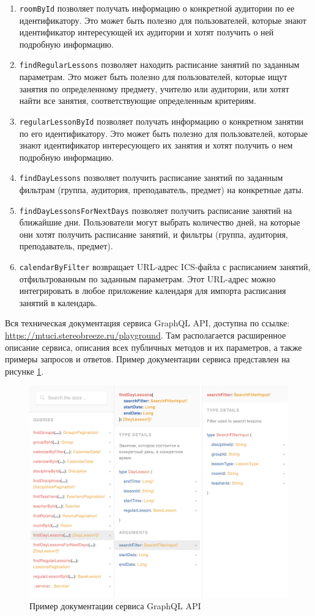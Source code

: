 \begin{enumerate}
\item \texttt{roomById} позволяет получать информацию о конкретной аудитории по ее идентификатору. 
Это может быть полезно для пользователей, которые знают идентификатор интересующей их аудитории и хотят получить о ней подробную информацию.
\item \texttt{findRegularLessons} позволяет находить расписание занятий по заданным параметрам.
Это может быть полезно для пользователей, которые ищут занятия по определенному предмету, учителю или аудитории, или хотят найти все занятия, соответствующие определенным критериям.
\item \texttt{regularLessonById} позволяет получать информацию о конкретном занятии по его идентификатору. 
Это может быть полезно для пользователей, которые знают идентификатор интересующего их занятия и хотят получить о нем подробную информацию.
\item \texttt{findDayLessons} позволяет получить расписание занятий по заданным фильтрам (группа, аудитория, преподаватель, предмет) на конкретные даты.
\item \texttt{findDayLessonsForNextDays} позволяет получить расписание занятий на ближайшие дни. 
Пользователи могут выбрать количество дней, на которые они хотят получить расписание занятий, и фильтры (группа, аудитория, преподаватель, предмет).
\item \texttt{calendarByFilter} возвращает URL-адрес ICS-файла с расписанием занятий, отфильтрованным по заданным параметрам. Этот URL-адрес можно интегрировать в любое приложение календаря для импорта расписания занятий в календарь.
\end{enumerate}

Вся техническая документация сервиса GraphQL API, доступна по ссылке:
\url{https://mtuci.stereobreeze.ru/playground}.
Там располагается расширенное описание сервиса, описания всех публичных методов и их параметров, а также примеры запросов и ответов.
Пример документации сервиса представлен на рисунке \ref{fig:back:doc}.

\begin{figure}
  \centering
  \includegraphics[width=0.8\linewidth]{images/back/doc.png}
  \caption{Пример документации сервиса GraphQL API}
  \label{fig:back:doc}
\end{figure}


